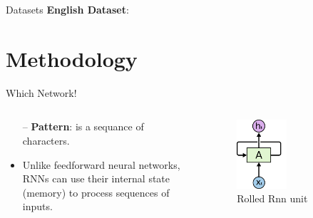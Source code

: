 \documentclass[10pt]{beamer}
\begin{document}
\begin{frame}[fragile]{Datasets}
\textbf{English Dataset}:
\begin{center}

\end{center}
\end{frame}


\section{Methodology}
\begin{frame}[fragile]{Which Network!}


\begin{columns}


\begin{column}{0.7\textwidth}
\begin{itemize}
    \item[--] \textbf{Pattern}: is a sequance of characters.
    \item  Unlike feedforward neural networks, RNNs can use their internal state (memory) to process sequences of inputs.
\end{itemize}

\end{column}



\begin{column}{0.5\textwidth}  %
    \begin{figure}
        \begin{center}
         \includegraphics[width=0.5\textwidth]{rolledRNN.png}
         \caption{Rolled Rnn unit}
         \end{center}
    \end{figure}
\end{column}
\end{columns}
\end{frame}
\end{document}
